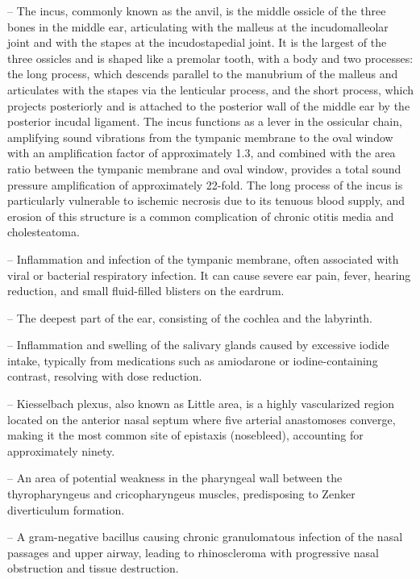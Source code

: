 -- The incus, commonly known as the anvil, is the middle ossicle of the three bones in the middle ear, articulating with the malleus at the incudomalleolar joint and with the stapes at the incudostapedial joint. It is the largest of the three ossicles and is shaped like a premolar tooth, with a body and two processes: the long process, which descends parallel to the manubrium of the malleus and articulates with the stapes via the lenticular process, and the short process, which projects posteriorly and is attached to the posterior wall of the middle ear by the posterior incudal ligament. The incus functions as a lever in the ossicular chain, amplifying sound vibrations from the tympanic membrane to the oval window with an amplification factor of approximately 1.3, and combined with the area ratio between the tympanic membrane and oval window, provides a total sound pressure amplification of approximately 22-fold. The long process of the incus is particularly vulnerable to ischemic necrosis due to its tenuous blood supply, and erosion of this structure is a common complication of chronic otitis media and cholesteatoma.

-- Inflammation and infection of the tympanic membrane, often associated with viral or bacterial respiratory infection. It can cause severe ear pain, fever, hearing reduction, and small fluid-filled blisters on the eardrum.

-- The deepest part of the ear, consisting of the cochlea and the labyrinth.

-- Inflammation and swelling of the salivary glands caused by excessive iodide intake, typically from medications such as amiodarone or iodine-containing contrast, resolving with dose reduction.

-- Kiesselbach plexus, also known as Little area, is a highly vascularized region located on the anterior nasal septum where five arterial anastomoses converge, making it the most common site of epistaxis (nosebleed), accounting for approximately ninety.

-- An area of potential weakness in the pharyngeal wall between the thyropharyngeus and cricopharyngeus muscles, predisposing to Zenker diverticulum formation.

-- A gram-negative bacillus causing chronic granulomatous infection of the nasal passages and upper airway, leading to rhinoscleroma with progressive nasal obstruction and tissue destruction.


